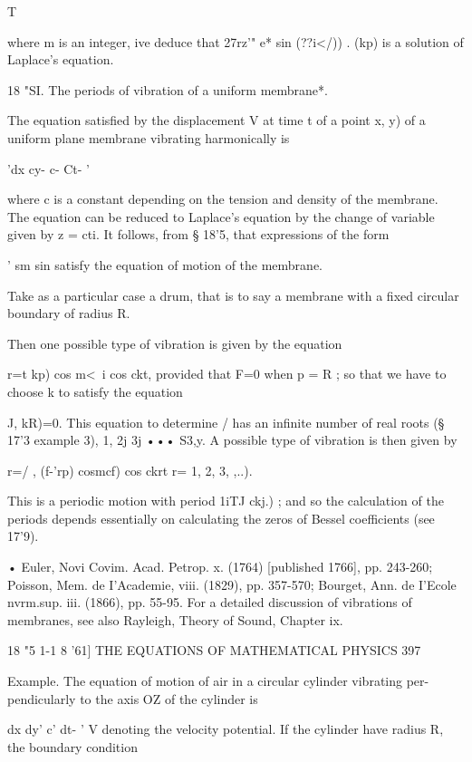 T 

where m is an integer, ive deduce that 27rz'" e*  sin (??i</)) .    (kp) is a solution 
of Laplace's equation. 

18 "SI. The periods of vibration of a uniform membrane*. 

The equation satisfied by the displacement V at time t of a point  x, y) of a uniform 
plane membrane vibrating harmonically is 

'dx  cy- c- Ct- ' 

where c is a constant depending on the tension and density of the membrane. The 
equation can be reduced to Laplace's equation by the change of variable given by z = cti. 
It follows, from § 18'5, that expressions of the form 

'  sm   sin 
satisfy the equation of motion of the membrane. 

Take as a particular case a drum, that is to say a membrane with a fixed circular 
boundary of radius R. 

Then one possible type of vibration is given by the equation 

r=t    kp) cos m<\ i cos ckt, 
provided that F=0 when p = R ; so that we have to choose k to satisfy the equation 

J,  kR)=0. 
This equation to determine /  has an infinite number of real roots (§ 17'3 example 3), 
 1,  2j  3j ••• S3,y. A possible type of vibration is then given by 

r=/ , (f-'rp) cosmcf) cos ckrt  r= 1, 2, 3, ,..). 

This is a periodic motion with period 1iTJ ckj.) ; and so the calculation of the periods 
depends essentially on calculating the zeros of Bessel coefficients (see   17'9). 

• Euler, Novi Covim. Acad. Petrop. x. (1764) [published 1766], pp. 243-260; Poisson, Mem. 
de I'Academie, viii. (1829), pp. 357-570; Bourget, Ann. de I'Ecole nvrm.sup. iii. (1866), pp. 55-95. 
For a detailed discussion of vibrations of membranes, see also Rayleigh, Theory of Sound, 
Chapter ix. 



18 "5 1-1 8 '61] THE EQUATIONS OF MATHEMATICAL PHYSICS 397 

Example. The equation of motion of air in a circular cylinder vibrating per- 
pendicularly to the axis OZ of the cylinder is 

dx  dy'  c' dt- ' 
V denoting the velocity potential. If the cylinder have radius R, the boundary condition 

